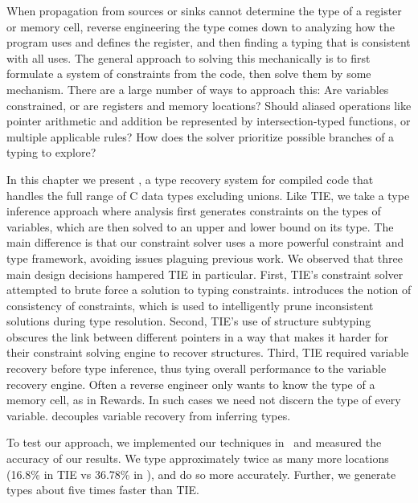 When propagation from sources or sinks cannot determine the type of a register or memory cell, reverse engineering the type comes down to analyzing how the program uses and defines the register, and then finding a typing that is consistent with all uses. The general approach to solving this mechanically is to first formulate a system of constraints from the code, then solve them by some mechanism. There are a large number of ways to approach this: Are variables constrained, or are registers and memory locations? Should aliased operations like pointer arithmetic and addition be represented by intersection-typed functions, or multiple applicable rules? How does the solver prioritize possible branches of a typing to explore?


In this chapter we present \bitr, a type recovery system for compiled code that handles the full range of C data types excluding unions. Like TIE, we take a type inference approach where analysis first generates constraints on the types of variables, which are then solved to an upper and lower bound on its type. The main difference is that our constraint solver uses a more powerful constraint and type framework, avoiding issues plaguing previous work. We observed that three main design decisions hampered TIE in particular. First, TIE's constraint solver attempted to brute force a solution to typing constraints. \bitr{} introduces the notion of consistency of constraints, which is used to intelligently prune inconsistent solutions during type resolution.  Second, TIE's use of structure subtyping obscures the link between different pointers in a way that makes it harder for their constraint solving engine to recover structures. Third, TIE required variable recovery before type inference, thus tying overall performance to the variable recovery engine. Often a reverse engineer only wants to know the type of a memory cell, as in Rewards.  In such cases we need not discern the type of every variable. \bitr{} decouples variable recovery from inferring types.


  To test our approach, we implemented our techniques in \bitr\ and measured the accuracy of our results. We type approximately twice as many more locations (16.8\% in TIE vs 36.78\% in \bitr), and do so more accurately. Further, we generate types about five times faster than TIE.


